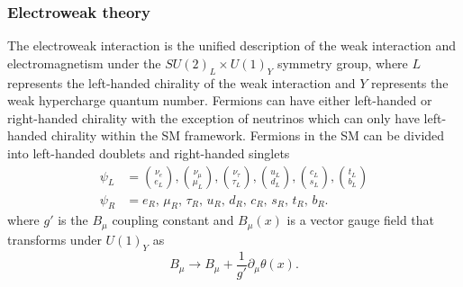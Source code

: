 \documentclass[../thesis.tex]{subfiles}
\begin{document}
\subsubsection{Electroweak theory}
The electroweak interaction is the unified description of the weak interaction and electromagnetism under the $SU(2)_L \times U(1)_Y$ symmetry group, where $L$ represents the left-handed chirality of the weak interaction and $Y$ represents the weak hypercharge quantum number.
Fermions can have either left-handed or right-handed chirality with the exception of neutrinos which can only have left-handed chirality within the \acs{SM} framework. Fermions in the \acs{SM} can be divided into left-handed doublets and right-handed singlets
\begin{equation}
\begin{aligned}
\psi_L &= \displaystyle\binom{\nu_e}{e_L}, \displaystyle\binom{\nu_\mu}{\mu_L}, \displaystyle\binom{\nu_\tau}{\tau_L}, \displaystyle\binom{u_L}{d_L}, \displaystyle\binom{c_L}{s_L}, \displaystyle\binom{t_L}{b_L} \\
\psi_R &= e_R\text{, }\mu_R\text{, }\tau_R\text{, }u_R\text{, }d_R\text{, }c_R\text{, }s_R\text{, }t_R\text{, }b_R.
\end{aligned}
\end{equation}
where $g'$ is the $B_\mu$ coupling constant and $B_\mu(x)$ is a vector gauge field that transforms under $U(1)_Y$ as
\begin{equation}
B_\mu \rightarrow B_\mu + \frac{1}{g'}\partial_\mu \theta(x).
\end{equation}
\end{document}
